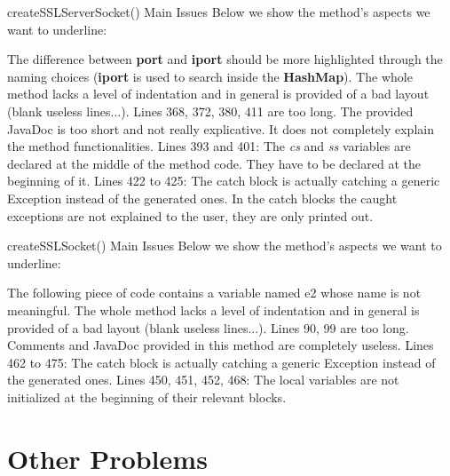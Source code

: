 \documentclass{../common/latex_classes/pdf_presentation}
\begin{document}
	\begin{frame}{createSSLServerSocket() Main Issues}
		Below we show the method's aspects we want to underline:
		\begin{itemize}
			 The difference between \textbf{port} and \textbf{iport} should be more highlighted through the naming choices (\textbf{iport} is used to search inside the \textbf{HashMap}).%
			 The whole method 	lacks a level of indentation and in general is provided of a bad layout (blank useless lines...).
			 Lines 368, 372, 380, 411 are too long.
			 The provided JavaDoc is too short and not really explicative. It does not completely explain the method functionalities.
			 Lines 393 and 401: The \textit{cs} and \textit{ss} variables are declared at the middle of the method code. They have to be declared at the beginning of it.
			 Lines 422 to 425: The catch block is actually catching a generic Exception instead of the generated ones.
			 In the catch blocks the caught exceptions are not explained to the user, they are only printed out.
		\end{itemize}
	\end{frame}
	
	\begin{frame}{createSSLSocket() Main Issues}
		Below we show the method's aspects we want to underline:
		\begin{itemize}
			 The following piece of code contains a variable named e2 whose name is not meaningful.%
			 The whole method 	lacks a level of indentation and in general is provided of a bad layout (blank useless lines...).
			 Lines 90, 99 are too long.
			Comments and JavaDoc provided in this method are completely useless.
			 Lines 462 to 475: The catch block is actually catching a generic Exception instead of the generated ones.
			 Lines 450, 451, 452, 468: The local variables are not initialized at the beginning of their relevant blocks.
		\end{itemize}
	\end{frame}
	
	\section{Other Problems}
	
\end{document}
